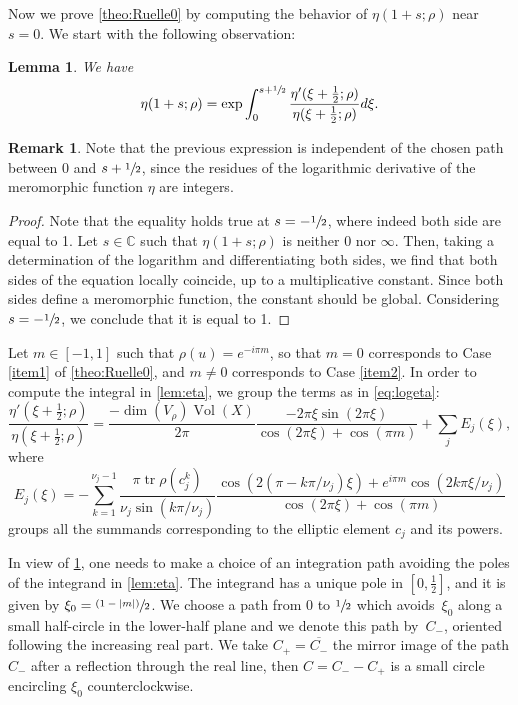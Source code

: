 \documentclass[JEP,XML,SOM,Unicode,NoFloatCountersInSection,published]{cedram}
\newcommand{\psfrac}[2]{\sfrac{(#1)}{#2}}
\theoremstyle{plain}
\newtheorem{lem}[thm]{Lemma}
\theoremstyle{definition}
\newtheorem{rmrk}[thm]{Remark}
\theoremstyle{remark}
\newcommand{\C}{\mathbb{C}}
\DeclareMathOperator{\tr}{tr}
\DeclareMathOperator{\Vol}{Vol}
\numberwithin{equation}{section}
\begin{document}
Now we prove \cref{theo:Ruelle0} by computing the behavior of $\eta(1+s;\rho)$ near $s=0$. We start with the following observation:
\begin{lem}
We have
\begin{equation}
\label{lem:eta}
\eta(1+s;\rho) = \exp \int_0^{s+\sfrac 1 2} \frac {\eta'(\xi+\frac 1 2;\rho)}{\eta(\xi+ \frac 1 2;\rho)} d\xi.
\end{equation}
\end{lem}
\begin{rmrk}
\label{remk:residues}
Note that the previous expression is independent of the chosen path between $0$ and $s+ \sfrac 1 2$, since the residues of the logarithmic derivative of the meromorphic function $\eta$ are integers.
\end{rmrk}

\begin{proof}
Note that the equality holds true at $s=-\sfrac{1}{2}$, where indeed both side are equal to 1. Let $s\in \C$ such that $\eta(1+s;\rho)$ is neither $0$ nor $\infty$. Then, taking a determination of the logarithm and differentiating both sides, we find that both sides of the equation locally coincide, up to a multiplicative constant. Since both sides define a meromorphic function, the constant should be global.
Considering $s=-\sfrac{1}{2}$, we conclude that it is equal to 1.
\end{proof}

Let $m \in [-1,1]$ such that $\rho(u) = e^{-i \pi m}$, so that $m=0$ corresponds to Case \ref{item1} of \cref{theo:Ruelle0}, and $m\neq 0$ corresponds to Case \ref{item2}.
In order to compute the integral in \cref{lem:eta}, we group the terms as in \cref{eq:logeta}:
\begin{equation}
\label{eq:sum}
\frac {\eta'(\xi+\frac 1 2;\rho)}{\eta(\xi+ \frac 1 2;\rho)} = \frac{-\dim(V_\rho) \Vol(X)}{2\pi} \frac {-2\pi \xi \sin(2\pi \xi)}{\cos(2\pi\xi) + \cos(\pi m)} + \sum_j E_j(\xi),
\end{equation}
where
\begin{equation}
\label{eq:Ei}
E_j(\xi) = -\sum_{k=1}^{\nu_j -1}\frac{\pi \tr \rho(c_j^k)}{\nu_j \sin (k \pi/\nu_j)} \frac{\cos \left(2(\pi-k\pi/\nu_j)\xi\right) + e^{i\pi m}\cos (2k\pi \xi/\nu_j)}{\cos(2\pi \xi)+ \cos(\pi m)}
\end{equation}
groups all the summands corresponding to the elliptic element $c_j$ and its powers.

In view of \cref{remk:residues}, one needs to make a choice of an integration path avoiding the poles of the integrand in \cref{lem:eta}. The integrand has a unique pole in $[0, \frac 1 2]$, and it is given by $\xi_0=\psfrac{1-|m|}{2}$. We choose a path from $0$ to $\sfrac{1}{2}$ which avoids~$\xi_0$ along a small half-circle in the lower-half plane and we denote this path by~$C_-$, oriented following the increasing real part. We take $C_+ = \overline {C_-}$ the mirror image of the path $C_-$ after a reflection through the real line, then $C = C_- - C_+$ is a small circle encircling $\xi_0$ counterclockwise.
\end{document}
